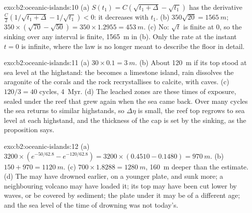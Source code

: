 \begin{solution}{exo:b2:oceanic-islands:10}
(a) $S(t_1) = C(\sqrt{t_1 + \Delta} - \sqrt{t_1})$ has the derivative $\frac C2(1/\sqrt{t_1 +
\Delta} - 1/\sqrt{t_1}) < 0$: it decreases with $t_1$. (b) $350\sqrt{20} = \qty{1565}{m}$; $350\times
(\sqrt{70} - \sqrt{50}) = 350\times1.2955 = \qty{453}{m}$. (c) No: $\sqrt t$ is finite at $0$, so
the sinking over any interval is finite, \qty{1565}{m} in (b). Only the rate at the instant $t = 0$
is infinite, where the law is no longer meant to describe the floor in detail.
\end{solution}

\begin{solution}{exo:b2:oceanic-islands:11}
(a) $30\times0.1 = \qty{3}{m}$. (b) About \qty{120}{m} if its top stood at sea level at the
highstand: the  becomes a limestone island, rain dissolves the aragonite of the corals and the
rock recrystallises to calcite, with caves. (c) $120/3 = 40$ cycles, \qty{4}{Myr}. (d) The leached
zones are these times of exposure, sealed under the reef that grew again when the sea came back.
Over many cycles the sea returns to similar highstands, so $\Delta\eta$ is small, the reef top
regrows to sea level at each highstand, and the thickness of the cap is set by the sinking, as the
proposition says.
\end{solution}

\begin{solution}{exo:b2:oceanic-islands:12}
(a) $3200\times(e^{-50/62.8} - e^{-120/62.8}) = 3200\times(0.4510 - 0.1480) = \qty{970}{m}$.
(b) $150 + 970 = \qty{1120}{m}$. (c) $700\times1.8288 = \qty{1280}{m}$, \qty{160}{m} deeper than the
estimate. (d) The  may have drowned earlier, on a younger plate, and sunk more; a neighbouring
volcano may have loaded it; its top may have been cut lower by waves, or be covered by sediment; the
plate under it may be of a different age; and the sea level of the time of drowning was not
today's.
\end{solution}

